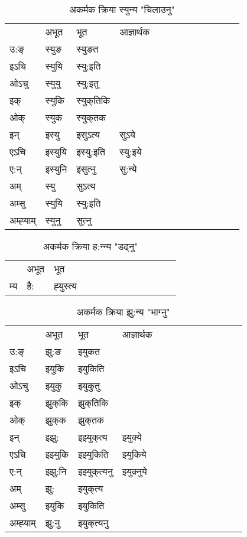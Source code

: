 \begin{table}[H]
\centering
\caption{\label{u.vi} अकर्मक क्रिया  स्युन्य  "चिलाउनु"  }
\begin{tabular}{l|l|l|l|l|l|l|l|l|l|l|l|l}  \toprule
&अभूत & भूत & आज्ञार्थक \\ 
उ:ङ्‌ &स्युङ &स्युङत \\ 
इऽचि &स्युयि &स्यु:इति   \\ 
ओऽचु &स्युयु &स्यु:इतु   \\ 
इक् &स्युकि &स्युक्‌तिकि   \\ 
ओक् &स्युक &स्युक्‌तक   \\ 
इन् & इस्यु & इसुऽत्य &सुऽये  \\ 
एऽचि & इस्युयि & इस्यु:इति &स्यु:इये    \\ 
ए:न् & इस्युनि  & इसुत्‍नु &सु:न्ये  \\ 
अम् & स्यु & सुऽत्य   \\ 
अम्सु & स्युयि & स्यु:इति     \\ 
अम्ह्‍याम् & स्युनु  & सुत्‍नु \\ 
\bottomrule
\end{tabular}
\end{table}


\begin{table}[H]
\centering
\caption{\label{ut.vi} अकर्मक क्रिया  ह:न्‍न्य  "डढ्नु"  }
\begin{tabular}{l|l|l|l|l|l|l|l|l|l|l|l|l}  \toprule
&अभूत & भूत   \\ 
म्य & है: & ह्‍युस्त्य   \\ 
\bottomrule
\end{tabular}
\end{table}


\begin{table}[H]
\centering
\caption{\label{uk.vi} अकर्मक क्रिया  झु:न्य  "भाग्नु"  }
\begin{tabular}{l|l|l|l|l|l|l|l|l|l|l|l|l}  \toprule
&अभूत & भूत & आज्ञार्थक \\ 
उ:ङ्‌ &झु:ङ &झ्युकत \\ 
इऽचि &झ्युकि &झ्युकिति   \\ 
ओऽचु &झ्युकु &झ्युकुतु   \\ 
इक् &झुक्‌कि &झुक्‌तिकि   \\ 
ओक् &झुक्‌क &झुक्‌तक   \\ 
इन् & इझु: & इझ्युक्‌त्य &झ्युक्ये  \\ 
एऽचि & इझ्युकि & इझ्युकिति &झ्युकिये    \\ 
ए:न् & इझु:नि  & इझ्युक्‌त्यनु &झ्युक्‍नुये  \\ 
अम् & झु: & झ्युक्‌त्य   \\ 
अम्सु & झ्युकि & झ्युकिति   \\ 
अम्ह्‍याम् & झु:नु  & झ्युक्‌त्यनु \\ 
\bottomrule
\end{tabular}
\end{table}


